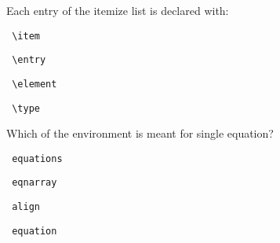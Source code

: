 \documentclass{exam}
\begin{document}
\begin{questions}
\question Each entry of the itemize list is declared with: %
\begin{multicols}{2}
	\begin{choices}
		\choice \begin{verbatim} \item \end{verbatim}
		\choice \begin{verbatim} \entry \end{verbatim}
		\choice \begin{verbatim} \element \end{verbatim}
		\choice \begin{verbatim} \type \end{verbatim}
	\end{choices}
\end{multicols}

\question Which of the environment is meant for single equation? %
\begin{multicols}{2}
	\begin{choices}
		\choice \begin{verbatim} equations \end{verbatim}
		\choice \begin{verbatim} eqnarray \end{verbatim}
		\choice \begin{verbatim} align \end{verbatim}
		\choice \begin{verbatim} equation \end{verbatim}
	\end{choices}
\end{multicols}

\end{questions}
\end{document}
